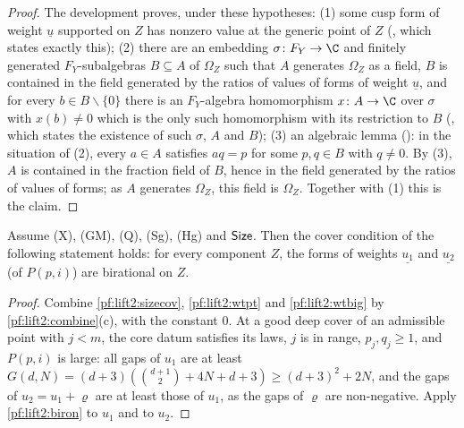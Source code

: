 \begin{proof}
The development proves, under these hypotheses:
(1) some cusp form of weight $\underline u$ supported on $Z$ has nonzero value at the generic point of $Z$
(, which states exactly this);
(2) there are an embedding $\sigma\colon F_Y\to\C$ and finitely generated $F_Y$-subalgebras $B\subseteq A$ of $\Omega_Z$ such
that $A$ generates $\Omega_Z$ as a field, $B$ is contained in the field generated by the ratios of values of forms of weight
$\underline u$, and for every $b\in B\smallsetminus\{0\}$ there is an $F_Y$-algebra homomorphism $x\colon A\to\C$ over
$\sigma$ with $x(b)\ne0$ which is the only such homomorphism with its restriction to $B$
(, which states the existence of such $\sigma$, $A$ and
$B$);
(3) an algebraic lemma (): in the situation of
(2), every $a\in A$ satisfies $aq=p$ for some $p,q\in B$ with $q\ne0$.
By (3), $A$ is contained in the fraction field of $B$, hence in the field generated by the ratios of values of forms; as
$A$ generates $\Omega_Z$, this field is $\Omega_Z$. Together with (1) this is the claim.
\end{proof}

\begin{proposition}\label{pf:lift2:biron12}
Assume \textup{(X)}, \textup{(GM)}, \textup{(Q)}, \textup{(Sg)}, \textup{(Hg)} and $\mathsf{Size}$. Then the cover condition
of the following statement holds: for every component $Z$, the forms of weights $\underline{u_1}$ and $\underline{u_2}$
(of $P(p,i)$) are birational on $Z$.
\end{proposition}

\begin{proof}
Combine \cref{pf:lift2:sizecov}, \cref{pf:lift2:wtpt} and \cref{pf:lift2:wtbig} by \cref{pf:lift2:combine}(c), with the
constant $0$. At a good deep cover of an admissible point with $j<m$, the core datum satisfies its laws, $j$ is in range,
$p_j,q_j\ge1$, and $P(p,i)$ is large: all gaps of $u_1$ are at least $G(d,N)=(d+3)(\binom{d+1}2+4N+d+3)\ge(d+3)^2+2N$, and
the gaps of $u_2=u_1+\varrho$ are at least those of $u_1$, as the gaps of $\varrho$ are non-negative. Apply
\cref{pf:lift2:biron} to $u_1$ and to $u_2$.
\end{proof}

